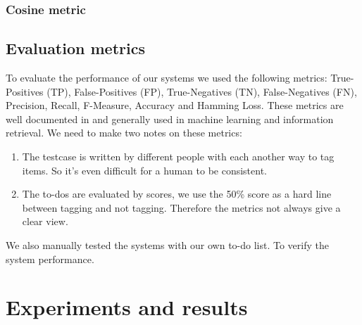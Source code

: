 \documentclass[a4paper,titlepage]{article}
\begin{document}
\subsubsection{Cosine metric}
\subsection{Evaluation metrics}
To evaluate the performance of our systems we used the following metrics: True-Positives (TP), False-Positives (FP), True-Negatives (TN), False-Negatives (FN), Precision, Recall, F-Measure, Accuracy and Hamming Loss. These metrics are well documented in \cite{Francis99performancemeasures} and generally used in machine learning and information retrieval. We need to make two notes on these metrics:
\begin{enumerate}
 \item The testcase is written by different people with each another way to tag items. So it's even difficult for a human to be consistent.
 \item The to-dos are evaluated by scores, we use the 50\% score as a hard line between tagging and not tagging. Therefore the metrics not always give a clear view.
\end{enumerate}
We also manually tested the systems with our own to-do list. To verify the system performance.
\section{Experiments and results}
\end{document}
